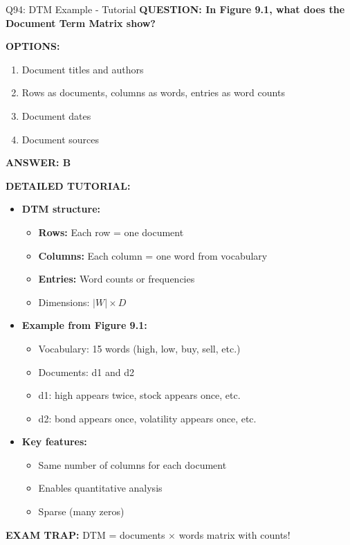 \documentclass[8pt]{beamer}
\begin{document}
	\begin{frame}{Q94: DTM Example - Tutorial}
		\fontsize{6.5}{7.5}\selectfont
		\textbf{QUESTION: In Figure 9.1, what does the Document Term Matrix show?}
		
		\vspace{0.1cm}
		\textbf{OPTIONS:}
		\begin{enumerate}
			\item Document titles and authors
			\item Rows as documents, columns as words, entries as word counts
			\item Document dates
			\item Document sources
		\end{enumerate}
		
		\vspace{0.1cm}
		\textcolor{myblue}{\textbf{ANSWER: B}}
		
		\vspace{0.1cm}
		\textbf{DETAILED TUTORIAL:}
		\begin{itemize}
			\item \textbf{DTM structure:}
			\begin{itemize}
				\item \textbf{Rows:} Each row = one document
				\item \textbf{Columns:} Each column = one word from vocabulary
				\item \textbf{Entries:} Word counts or frequencies
				\item Dimensions: $|W| \times D$
			\end{itemize}
			\item \textbf{Example from Figure 9.1:}
			\begin{itemize}
				\item Vocabulary: 15 words (high, low, buy, sell, etc.)
				\item Documents: d1 and d2
				\item d1: high appears twice, stock appears once, etc.
				\item d2: bond appears once, volatility appears once, etc.
			\end{itemize}
			\item \textbf{Key features:}
			\begin{itemize}
				\item Same number of columns for each document
				\item Enables quantitative analysis
				\item Sparse (many zeros)
			\end{itemize}
		\end{itemize}
		
		\textcolor{myred}{\textbf{EXAM TRAP:}} DTM = \textcolor{myblue}{documents $\times$ words matrix with counts}!
	\end{frame}
	
\end{document}
